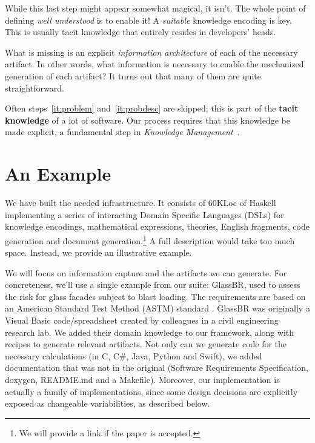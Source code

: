 \documentclass[sigconf,review,anonymous=false]{acmart}
\newcommand{\CC}{C\nolinebreak\hspace{-.05em}\raisebox{.4ex}{\small\bf +}\nolinebreak\hspace{-.10em}\raisebox{.4ex}{\small\bf +}}
\begin{document}
While this last step might appear somewhat magical, it isn't. The whole point of
defining \emph{well understood} is to enable it! A \emph{suitable}
knowledge encoding is key. This is usually tacit knowledge that
entirely resides in developers' heads.

What is missing is an explicit \emph{information architecture} of each of
the necessary artifact. In other words, what information is necessary to
enable the mechanized generation of each artifact? It turns out that many
of them are quite straightforward.

Often steps~\ref{it:problem} and~\ref{it:probdesc} are skipped; this is
part of the \textbf{tacit knowledge} of a lot
of software.  Our process requires that this knowledge be made explicit,
a fundamental step in \emph{Knowledge Management}~\cite{Dalkir2011}.


\section{An Example}\label{ch:example}

We have built the needed infrastructure. It consists of 60KLoc of Haskell
implementing a series of interacting Domain Specific Languages (DSLs) for
knowledge encodings, mathematical expressions, theories, English fragments,
code generation and document generation.\footnote{We will provide a link
if the paper is accepted.} A full description would take too much space.
Instead, we provide an illustrative example.

We will focus on information capture and the artifacts we can generate. For
concreteness, we'll use a single example from our suite: GlassBR, used to
assess the risk for glass facades subject to blast loading.
The requirements are based on an American Standard Test Method (ASTM) standard
\cite{BeasonEtAl1998, ASTM2009}. GlassBR was originally a Visual
Basic code/spreadsheet created by colleagues in a civil engineering research
lab.  We added their domain knowledge to our framework, along with recipes to
generate relevant artifacts.  Not only can we generate code for the necessary
calculations (in \CC, C\#, Java, Python and Swift), we added documentation that
was not in the original (Software Requirements Specification, doxygen, README.md
and a Makefile). Moreover, our implementation is actually a family of
implementations, since some design decisions are explicitly exposed as
changeable variabilities, as described below.
\end{document}
